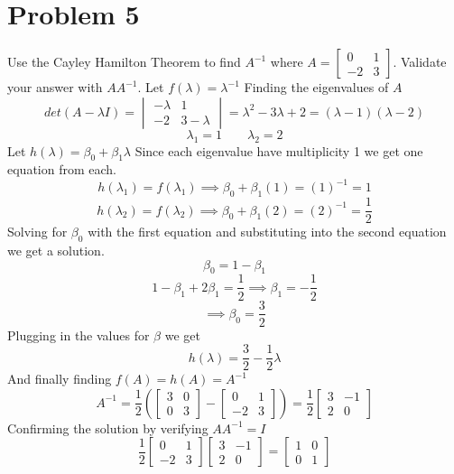 \documentclass{article}
\begin{document}
\section*{Problem 5}
Use the Cayley Hamilton Theorem to find $A^{-1}$ where $A = \begin{bmatrix} 0 & 1 \\ -2 & 3 \end{bmatrix}$.
Validate your answer with $AA^{-1}$.
\newline
Let $f(\lambda)=\lambda^{-1}$
Finding the eigenvalues of $A$
$$det(A - \lambda I) =
\begin{vmatrix}
-\lambda & 1 \\
-2 & 3 - \lambda
\end{vmatrix}
=
\lambda^2 - 3\lambda + 2
=
(\lambda - 1)(\lambda - 2)
$$
$$ \lambda_1 = 1 \qquad \lambda_2 = 2 $$
Let $h(\lambda) = \beta_0 + \beta_1 \lambda$
Since each eigenvalue have multiplicity 1 we get one equation from each.
$$ h(\lambda_1) = f(\lambda_1) \implies \beta_0 + \beta_1(1) = (1)^{-1} = 1 $$
$$ h(\lambda_2) = f(\lambda_2) \implies \beta_0 + \beta_1(2) = (2)^{-1} = \frac{1}{2} $$
Solving for $\beta_0$ with the first equation and substituting into the second equation we get a solution.
$$\beta_0 = 1 - \beta_1$$  
$$ 1 -\beta_1 + 2\beta_1 = \frac{1}{2} \implies \beta_1 = -\frac{1}{2}$$
$$\implies \beta_0 = \frac{3}{2} $$
Plugging in the values for $\beta$ we get
$$ h(\lambda) = \frac{3}{2} - \frac{1}{2} \lambda $$
And finally finding $ f(A) = h(A) = A^{-1} $
$$ A^{-1} =
\frac{1}{2}
(
\begin{bmatrix}
3 & 0 \\
0 & 3
\end{bmatrix}
-
\begin{bmatrix}
0 & 1 \\
-2 & 3
\end{bmatrix}
)
=
\frac{1}{2}
\begin{bmatrix}
3 & -1 \\
2 & 0
\end{bmatrix}
$$
Confirming the solution by verifying $AA^{-1} = I$
$$
\frac{1}{2}
\begin{bmatrix}
0 & 1 \\
-2 & 3
\end{bmatrix}
\begin{bmatrix}
3 & -1 \\
2 & 0
\end{bmatrix}
=
\begin{bmatrix}
1 & 0 \\
0 & 1
\end{bmatrix}
$$
\end{document}
